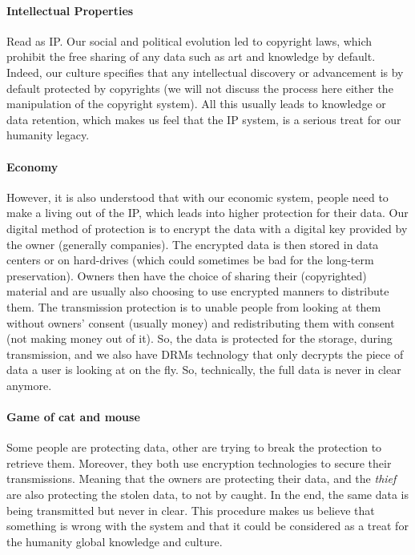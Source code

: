\paragraph{Intellectual Properties} Read as IP. Our social and political evolution led to copyright laws, which prohibit the free sharing of any data such as art and knowledge by default. Indeed, our culture specifies that any intellectual discovery or advancement is by default protected by copyrights (we will not discuss the process here either the manipulation of the copyright system). All this usually leads to knowledge or data retention, which makes us feel that the IP system, is a serious treat for our humanity legacy.

\paragraph{Economy} However, it is also understood that with our economic system, people need to make a living out of the IP, which leads into higher protection for their data. Our digital method of protection is to encrypt the data with a digital key provided by the owner (generally companies). The encrypted data is then stored in data centers or on hard-drives (which could sometimes be bad for the long-term preservation). Owners then have the choice of sharing their (copyrighted) material and are usually also choosing to use encrypted manners to distribute them. The transmission protection is to unable people from looking at them without owners' consent (usually money) and redistributing them with consent (not making money out of it). So,  the data is protected for the storage, during transmission, and we also have DRMs technology that only decrypts the piece of data a user is looking at on the fly. So, technically, the full data is never in clear anymore.

\paragraph{Game of cat and mouse} Some people are protecting data, other are trying to break the protection to retrieve them. Moreover, they both use encryption technologies to secure their transmissions. Meaning that the owners are protecting their data, and the \textit{thief} are also protecting the stolen data, to not by caught. In the end, the same data is being transmitted but never in clear. This procedure makes us believe that something is wrong with the system and that it could be considered as a treat for the humanity global knowledge and culture.


